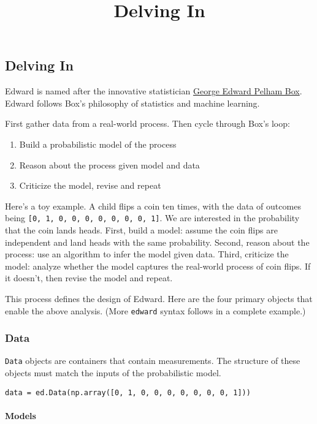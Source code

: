 \title{Delving In}

\subsection{Delving In}
Edward is named after the innovative statistician
\href{https://en.wikipedia.org/wiki/George_E._P._Box}{George Edward
Pelham Box}. Edward follows Box's philosophy of statistics and machine
learning.

First gather data from a real-world process. Then cycle through Box's
loop:

\begin{enumerate}
\item Build a probabilistic model of the process
\item Reason about the process given model and data
\item Criticize the model, revise and repeat
\end{enumerate}

Here's a toy example. A child flips a coin ten times, with the data of
outcomes being \texttt{{[}0,\ 1,\ 0,\ 0,\ 0,\ 0,\ 0,\ 0,\ 0,\ 1{]}}. We
are interested in the probability that the coin lands heads. First,
build a model: assume the coin flips are independent and land heads with
the same probability. Second, reason about the process: use an algorithm
to infer the model given data. Third, criticize the model: analyze
whether the model captures the real-world process of coin flips. If it
doesn't, then revise the model and repeat.

This process defines the design of Edward. Here are the four
primary objects that enable the above analysis. (More \texttt{edward}
syntax follows in a complete example.)

\subsubsection{Data}

\texttt{Data} objects are containers that contain measurements. The
structure of these objects must match the inputs of the probabilistic
model.

\begin{verbatim}
data = ed.Data(np.array([0, 1, 0, 0, 0, 0, 0, 0, 0, 1]))
\end{verbatim}

\paragraph{Models}\label{models}

